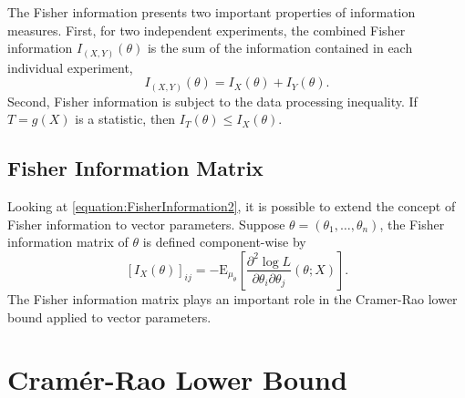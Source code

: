The Fisher information presents two important properties of information measures.
First, for two independent experiments, the combined Fisher information $I_{(X,Y)} (\theta)$ is the sum of the information contained in each individual experiment,
\begin{equation*}
I_{(X,Y)} (\theta) = I_{X} (\theta) + I_{Y} (\theta) .
\end{equation*}
Second, Fisher information is subject to the data processing inequality.
If $T = g(X)$ is a statistic, then $I_T (\theta) \leq I_X (\theta)$.


\subsection{Fisher Information Matrix}

Looking at \eqref{equation:FisherInformation2}, it is possible to extend the concept of Fisher information to vector parameters.
Suppose $\theta = (\theta_1, \ldots, \theta_n)$, the Fisher information matrix of $\theta$ is defined component-wise by
\begin{equation} \label{equation:FisherInformationMatrix}
\left[ I_X (\theta) \right]_{ij}
= - \mathrm{E}_{\mu_{\theta}} \left[ \frac{\partial^2 \log L}{\partial \theta_i \partial \theta_j} (\theta; X) \right] .
\end{equation}
The Fisher information matrix plays an important role in the Cramer-Rao lower bound applied to vector parameters.

\newpage
\section{Cram\'{e}r-Rao Lower Bound}

